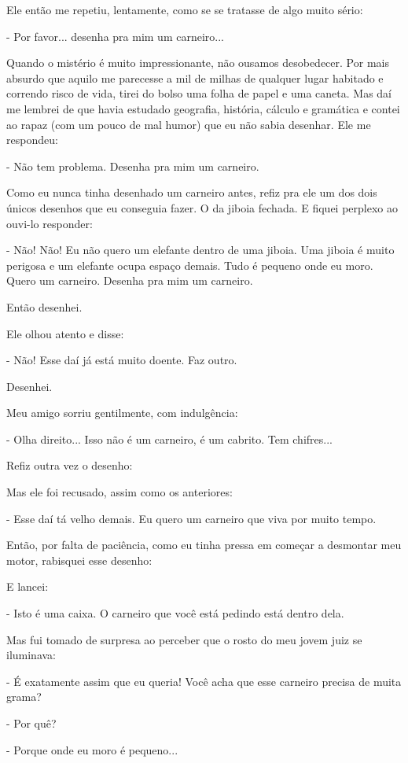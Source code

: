 \begin{Parallel}[p]{}{}
{Ele então me repetiu, lentamente, como se se tratasse de algo muito
sério:

- Por favor... desenha pra mim um carneiro...

Quando o mistério é muito impressionante, não ousamos desobedecer. Por
mais absurdo que aquilo me parecesse a mil de milhas de qualquer lugar
habitado e correndo risco de vida, tirei do bolso uma folha de papel e
uma caneta. Mas daí me lembrei de que havia estudado geografia,
história, cálculo e gramática e contei ao rapaz (com um pouco de mal
humor) que eu não sabia desenhar. Ele me respondeu:

- Não tem problema. Desenha pra mim um carneiro.

Como eu nunca tinha desenhado um carneiro antes, refiz pra ele um dos
dois únicos desenhos que eu conseguia fazer. O da jiboia fechada. E
fiquei perplexo ao ouvi-lo responder:

- Não! Não! Eu não quero um elefante dentro de uma jiboia. Uma jiboia é
muito perigosa e um elefante ocupa espaço demais. Tudo é pequeno onde eu
moro. Quero um carneiro. Desenha pra mim um carneiro.

Então desenhei.

Ele olhou atento e disse:

- Não! Esse daí já está muito doente. Faz outro.

Desenhei.

Meu amigo sorriu gentilmente, com indulgência:

- Olha direito... Isso não é um carneiro, é um cabrito. Tem chifres...

Refiz outra vez o desenho:

Mas ele foi recusado, assim como os anteriores:

- Esse daí tá velho demais. Eu quero um carneiro que viva por muito
tempo.

Então, por falta de paciência, como eu tinha pressa em começar a
desmontar meu motor, rabisquei esse desenho:

E lancei:

- Isto é uma caixa. O carneiro que você está pedindo está dentro dela.

Mas fui tomado de surpresa ao perceber que o rosto do meu jovem juiz se
iluminava:

- É exatamente assim que eu queria! Você acha que esse carneiro precisa
de muita grama?

- Por quê?

- Porque onde eu moro é pequeno...

}
\end{Parallel}
